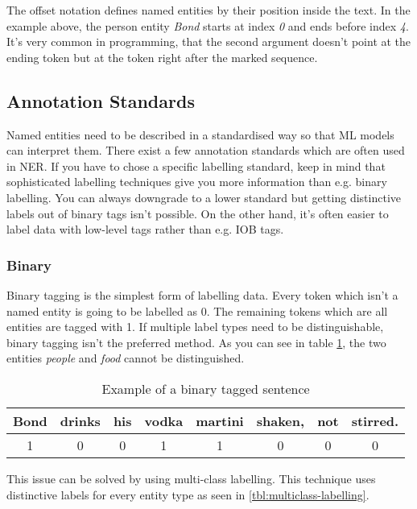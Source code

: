 The offset notation defines named entities by their position inside the text. In the example above, the person entity \emph{Bond} starts at index \emph{0} and ends before index \emph{4}. It's very common in programming, that the second argument doesn't point at the ending token but at the token right after the marked sequence.

\subsection{Annotation Standards}

Named entities need to be described in a standardised way so that ML models can interpret them. There exist a few annotation standards which are often used in NER. If you have to chose a specific labelling standard, keep in mind that sophisticated labelling techniques give you more information than e.g. binary labelling. You can always downgrade to a lower standard but getting distinctive labels out of binary tags isn't possible. On the other hand, it's often easier to label data with low-level tags rather than e.g. IOB tags.

\subsubsection{Binary}

Binary tagging is the simplest form of labelling data. Every token which isn't a named entity is going to be labelled as 0. The remaining tokens which are all entities are tagged with 1. If multiple label types need to be distinguishable, binary tagging isn't the preferred method. As you can see in table \ref{tbl:binary-labelling}, the two entities \emph{people} and \emph{food} cannot be distinguished.

\begin{table}[h!]
    \centering
    \begin{tabular}{|c|c|c|c|c|c|c|c|}
        \hline
        Bond & drinks & his & vodka & martini & shaken, & not & stirred. \\
        \hline
        1 & 0 & 0 & 1 & 1 & 0 & 0 & 0 \\
        \hline
    \end{tabular}
    \caption{Example of a binary tagged sentence}
    \label{tbl:binary-labelling}
\end{table}

This issue can be solved by using multi-class labelling. This technique uses distinctive labels for every entity type as seen in \ref{tbl:multiclass-labelling}.

